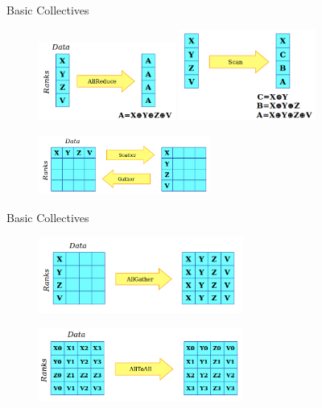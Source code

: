 \begin{frame}[fragile]{Basic Collectives}

\begin{figure}
\includegraphics[width=0.4\textwidth]{img/MPI_AllReduce.png} 
\hfill
\includegraphics[width=0.4\textwidth]{img/MPI_Scan.png}
\end{figure}

  \vspace{-5mm}
\begin{figure}
    \centering
    \includegraphics[width=0.5\textwidth]{img/MPI_ScatterGather.png}
\end{figure} 
\end{frame}

\begin{frame}[fragile]{Basic Collectives}

\begin{figure}
\includegraphics[width=0.6\textwidth]{img/MPI_AllGather.png} 
\end{figure}

  \vspace{-3mm}
  
\begin{figure}
    \centering
    \includegraphics[width=0.6\textwidth]{img/MPI_AlltoAll.png}
\end{figure} 
\end{frame}

